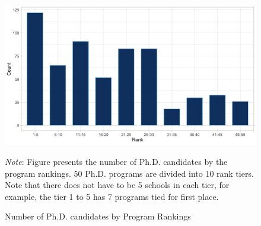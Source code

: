 \begin{figure}[H]
    \begin{center}
    \caption{Number of Ph.D. candidates by Program Rankings}
    \includegraphics[width=140mm, scale=0.5]{fig/figure1.png}
    \end{center}
	\label{fig:figure1}
    \vspace{0.3cm}
    \begin{minipage}{0.95\textwidth} 
	{\footnotesize \textit{Note}: Figure presents the number of Ph.D. candidates by the program rankings. 50 Ph.D. programs are divided into 10 rank tiers. Note that there does not have to be 5 schools in each tier, for example, the tier 1 to 5 has 7 programs tied for first place.
	\par
	}
	\end{minipage}
\end{figure}
